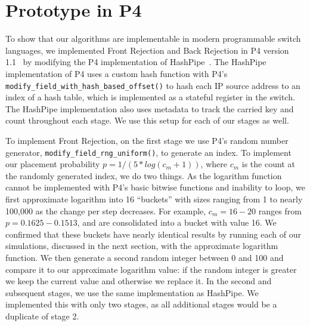 \section{Prototype in P4}
\label{sec:prototype}
To show that our algorithms are implementable in modern programmable switch languages, we implemented Front Rejection and Back Rejection in P4 version 1.1~\cite{p4lang} by modifying the P4 implementation of HashPipe~\cite{p4code}. The HashPipe implementation of P4 uses a custom hash function with P4's \verb+modify_field_with_hash_based_offset()+ to hash each IP source address to an index of a hash table, which is implemented as a stateful register in the switch. The HashPipe implementation also uses metadata to track the carried key and count throughout each stage. We use this setup for each of our stages as well.

To implement Front Rejection, on the first stage we use P4's random number generator, \verb+modify_field_rng_uniform()+, to generate an index. To implement our placement probability $p = 1 / (5*log(c_m + 1))$, where $c_m$ is the count at the randomly generated index, we do two things. As the logarithm function cannot be implemented with P4's basic bitwise functions and inability to loop, we first approximate logarithm into 16 ``buckets'' with sizes ranging from 1 to nearly 100,000 as the change per step decreases. For example, $c_m = 16-20$ ranges from $p=0.1625-0.1513$, and are consolidated into a bucket with value 16. We confirmed that these buckets have nearly identical results by running each of our simulations, discussed in the next section, with the approximate logarithm function. We then generate a second random integer between 0 and 100 and compare it to our approximate logarithm value: if the random integer is greater we keep the current value and otherwise we replace it. In the second and subsequent stages, we use the same implementation as HashPipe. We implemented this with only two stages, as all additional stages would be a duplicate of stage 2.

